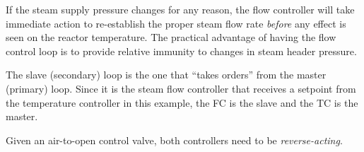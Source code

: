 If the steam supply pressure changes for any reason, the flow controller will take immediate action to re-establish the proper steam flow rate {\it before} any effect is seen on the reactor temperature.  The practical advantage of having the flow control loop is to provide relative immunity to changes in steam header pressure.

The slave (secondary) loop is the one that ``takes orders'' from the master (primary) loop.  Since it is the steam flow controller that receives a setpoint from the temperature controller in this example, the FC is the slave and the TC is the master.

\vskip 10pt

Given an air-to-open control valve, both controllers need to be {\it reverse-acting}.




